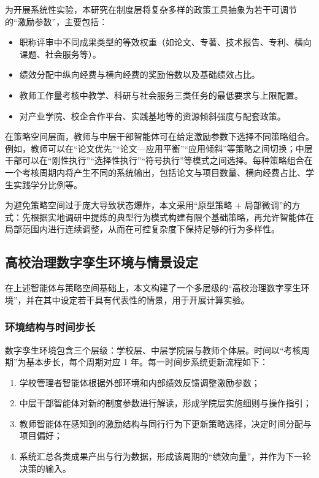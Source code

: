 \documentclass[UTF8, zihao=-4, fontset=mac]{ctexart}
\begin{document}
为开展系统性实验，本研究在制度层将复杂多样的政策工具抽象为若干可调节的“激励参数”，主要包括：

\begin{itemize}
    \item 职称评审中不同成果类型的等效权重（如论文、专著、技术报告、专利、横向课题、社会服务等）。
    \item 绩效分配中纵向经费与横向经费的奖励倍数以及基础绩效占比。
    \item 教师工作量考核中教学、科研与社会服务三类任务的最低要求与上限配置。
    \item 对产业学院、校企合作平台、实践基地等的资源倾斜强度与配套政策。
\end{itemize}

在策略空间层面，教师与中层干部智能体可在给定激励参数下选择不同策略组合。例如，教师可以在“论文优先”“论文—应用平衡”“应用倾斜”等策略之间切换；中层干部可以在“刚性执行”“选择性执行”“符号执行”等模式之间选择。每种策略组合在一个考核周期内将产生不同的系统输出，包括论文与项目数量、横向经费占比、学生实践学分比例等。

为避免策略空间过于庞大导致状态爆炸，本文采用“原型策略 + 局部微调”的方式：先根据实地调研中提炼的典型行为模式构建有限个基础策略，再允许智能体在局部范围内进行连续调整，从而在可控复杂度下保持足够的行为多样性。

\subsection{高校治理数字孪生环境与情景设定}

在上述智能体与策略空间基础上，本文构建了一个多层级的“高校治理数字孪生环境”，并在其中设定若干具有代表性的情景，用于开展计算实验。

\subsubsection{环境结构与时间步长}

数字孪生环境包含三个层级：学校层、中层学院层与教师个体层。时间以“考核周期”为基本步长，每个周期对应 1 年。每一时间步系统更新流程如下：

\begin{enumerate}
    \item 学校管理者智能体根据外部环境和内部绩效反馈调整激励参数；
    \item 中层干部智能体对新的制度参数进行解读，形成学院层实施细则与操作指引；
    \item 教师智能体在感知到的激励结构与同行行为下更新策略选择，决定时间分配与项目偏好；
    \item 系统汇总各类成果产出与行为数据，形成该周期的“绩效向量”，并作为下一轮决策的输入。
\end{enumerate}
\end{document}
